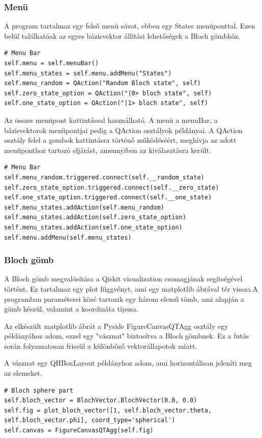 \documentclass[
]{thesis-ekf}
\theoremstyle{definition}
\theoremstyle{remark}
\begin{document}
\subsubsection{Menü}
A program tartalmaz egy felső menü sávot, ebben egy States menüponttal. Ezen belül találhatóak az egyes bázisvektor állítási lehetőségek a Bloch gömbhöz. 

\begin{lstlisting}[caption={Menü inicializálása}]
# Menu Bar
self.menu = self.menuBar()
self.menu_states = self.menu.addMenu("States")
self.menu_random = QAction("Random Bloch state", self)
self.zero_state_option = QAction("|0> bloch state", self)
self.one_state_option = QAction("|1> bloch state", self)
\end{lstlisting}

Az összes menüpont kattintással használható. A menü a menuBar, a bázisvektorok menüpontjai pedig a QAction osztályok példányai. A QAction osztály felel a gombok kattintásra történő működéséért, meghívja az adott menüponthoz tartozó eljárást, amennyiben az kiválasztásra került.

\begin{lstlisting}[caption={Menü elemek bekötése}]
# Menu Bar
self.menu_random.triggered.connect(self.__random_state)
self.zero_state_option.triggered.connect(self.__zero_state)
self.one_state_option.triggered.connect(self.__one_state)
self.menu_states.addAction(self.menu_random)
self.menu_states.addAction(self.zero_state_option)
self.menu_states.addAction(self.one_state_option)
self.menu.addMenu(self.menu_states)
\end{lstlisting}

\subsubsection{Bloch gömb}
A Bloch gömb megvalósítása a Qiskit visualization csomagjának segítségével történt. Ez tartalmaz egy plot függvényt, ami egy matplotlib ábrával tér vissza.A programban paraméterei közé tartozik egy három elemű tömb, ami alapján a gömb készül, valamint a koordináta típusa. 

Az elkészült matplotlib ábrát a Pyside FigureCanvasQTAgg osztály egy példányához adom, ezzel egy "vásznat" biztosítva a Bloch gömbnek. Ez a futás során folyamatosan frissül a különböző vektorállapotok miatt.

A vásznat egy QHBoxLayout példányhoz adom, ami horizontálisan jeleníti meg az elemeket.

\begin{lstlisting}[caption={A Bloch gömb kezdő állapota a konstruktorban},label=blochspherestart]
# Bloch sphere part
self.bloch_vector = BlochVector.BlochVector(0.0, 0.0)
self.fig = plot_bloch_vector([1, self.bloch_vector.theta, self.bloch_vector.phi], coord_type='spherical')
self.canvas = FigureCanvasQTAgg(self.fig)
\end{lstlisting}
\end{document}
